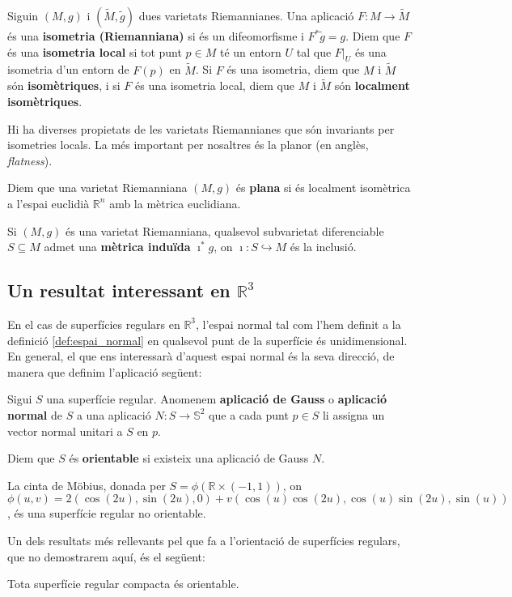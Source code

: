 \begin{defi}
    Siguin $(M,g)$ i $(\tilde M,\tilde g)$ dues varietats Riemannianes. Una aplicació $F: M\to \tilde M$ és una \textbf{isometria (Riemanniana)} si és un difeomorfisme i $F^*\tilde g = g$. Diem que $F$ és una \textbf{isometria local} si tot punt $p\in M$ té un entorn $U$ tal que $F|_U$ és una isometria d'un entorn de $F(p)$ en $\tilde M$. Si $F$ és una isometria, diem que $M$ i $\tilde M$ són \textbf{isomètriques}, i si $F$ és una isometria local, diem que $M$ i $\tilde M$ són \textbf{localment isomètriques}.
\end{defi}

Hi ha diverses propietats de les varietats Riemannianes que són invariants per isometries locals. La més important per nosaltres és la planor (en anglès, \textit{flatness}).
\begin{defi}\label{def:flatness}
    Diem que una varietat Riemanniana $(M,g)$ és \textbf{plana} si és localment isomètrica a l'espai euclidià $\mathbb R^n$ amb la mètrica euclidiana.
\end{defi}

Si $(M,g)$ és una varietat Riemanniana, qualsevol subvarietat diferenciable $S\subseteq M$ admet una \textbf{mètrica induïda} $\imath^*g$, on $\imath:S\hookrightarrow M$ és la inclusió.


\subsection{Un resultat interessant en $\mathbb R^3$}

En el cas de superfícies regulars en $\mathbb R^3$, l'espai normal tal com l'hem definit a la definició \ref{def:espai_normal} en qualsevol punt de la superfície és unidimensional. En general, el que ens interessarà d'aquest espai normal és la seva direcció, de manera que definim l'aplicació següent:
\begin{defi}
    Sigui $S$ una superfície regular. Anomenem \textbf{aplicació de Gauss} o \textbf{aplicació normal} de $S$ a una aplicació $N:S\to \mathbb S^2$ que a cada punt $p\in S$ li assigna un vector normal unitari a $S$ en $p$.
\end{defi}
Diem que $S$ és \textbf{orientable} si existeix una aplicació de Gauss $N$.
\begin{ex}
    La cinta de Möbius, donada per $S=\phi(\mathbb R \times (-1,1))$, on $\phi(u,v) = 2(\cos(2u), \sin(2u), 0) + v(\cos(u)\cos(2u), \cos(u)\sin(2u), \sin(u))$, és una superfície regular no orientable.
\end{ex}
Un dels resultats més rellevants pel que fa a l'orientació de superfícies regulars, que no demostrarem aquí, és el següent:
\begin{teo}
    Tota superfície regular compacta és orientable.
\end{teo}

